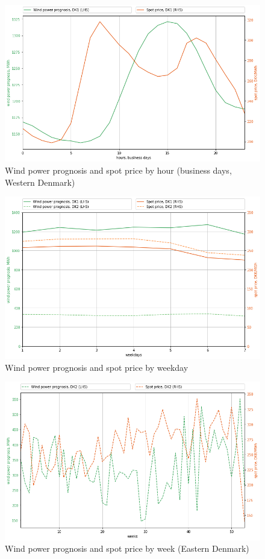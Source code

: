 \begin{figure}[H]
  \centering
  \caption{Wind power prognosis and spot price by hour (business days, Western Denmark)}
  \label{fig:wp_dk1_hours}
    \includegraphics[width=1 \textwidth]{03_figures/wp_DK1_hours, business days}
\end{figure}

\begin{figure}[H]
  \centering
  \caption{Wind power prognosis and spot price by weekday}
  \label{fig:wp_price_weekday}
    \includegraphics[width=1 \textwidth]{03_figures/wp_weekdays}
\end{figure}

\begin{figure}[H]
  \centering
  \caption{Wind power prognosis and spot price by week (Eastern Denmark)}
  \label{fig:wp_price_dk2_week}
    \includegraphics[width=1 \textwidth]{03_figures/wp_DK2_weeks}
\end{figure}
